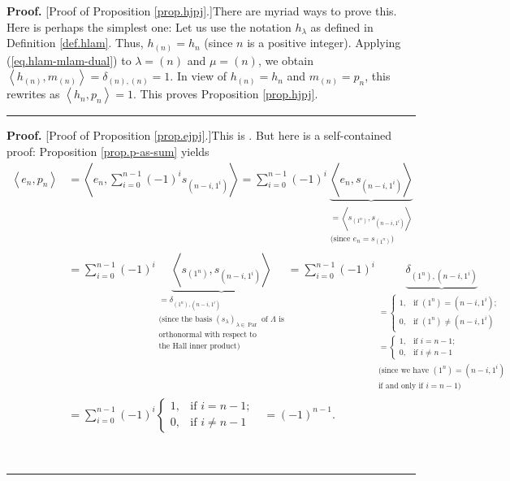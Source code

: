 \documentclass[numbers=enddot,12pt,final,onecolumn,notitlepage]{scrartcl}%
\theoremstyle{definition}
\newenvironment{proof}[1][Proof]{\noindent\textbf{#1.} }{\ \rule{0.5em}{0.5em}}
\let\sumnonlimits\sum
\renewcommand{\sum}{\sumnonlimits\limits}
\begin{document}
\begin{proof}
[Proof of Proposition \ref{prop.hjpj}.]There are myriad ways to prove this.
Here is perhaps the simplest one: Let us use the notation $h_{\lambda}$ as
defined in Definition \ref{def.hlam}. Thus, $h_{\left(  n\right)  }=h_{n}$
(since $n$ is a positive integer). Applying (\ref{eq.hlam-mlam-dual}) to
$\lambda=\left(  n\right)  $ and $\mu=\left(  n\right)  $, we obtain
$\left\langle h_{\left(  n\right)  },m_{\left(  n\right)  }\right\rangle
=\delta_{\left(  n\right)  ,\left(  n\right)  }=1$. In view of $h_{\left(
n\right)  }=h_{n}$ and $m_{\left(  n\right)  }=p_{n}$, this rewrites as
$\left\langle h_{n},p_{n}\right\rangle =1$. This proves Proposition
\ref{prop.hjpj}.
\end{proof}

\begin{proof}
[Proof of Proposition \ref{prop.ejpj}.]This is \cite[Exercise 2.8.8(a)]%
{GriRei}. But here is a self-contained proof: Proposition \ref{prop.p-as-sum}
yields%
\begin{align*}
\left\langle e_{n},p_{n}\right\rangle  &  =\left\langle e_{n},\sum_{i=0}%
^{n-1}\left(  -1\right)  ^{i}s_{\left(  n-i,1^{i}\right)  }\right\rangle
=\sum_{i=0}^{n-1}\left(  -1\right)  ^{i}\underbrace{\left\langle
e_{n},s_{\left(  n-i,1^{i}\right)  }\right\rangle }_{\substack{=\left\langle
s_{\left(  1^{n}\right)  },s_{\left(  n-i,1^{i}\right)  }\right\rangle
\\\text{(since }e_{n}=s_{\left(  1^{n}\right)  }\text{)}}}\\
&  =\sum_{i=0}^{n-1}\left(  -1\right)  ^{i}\underbrace{\left\langle s_{\left(
1^{n}\right)  },s_{\left(  n-i,1^{i}\right)  }\right\rangle }%
_{\substack{=\delta_{\left(  1^{n}\right)  ,\left(  n-i,1^{i}\right)
}\\\text{(since the basis }\left(  s_{\lambda}\right)  _{\lambda
\in\operatorname*{Par}}\text{ of }\Lambda\text{ is}\\\text{orthonormal with
respect to}\\\text{the Hall inner product)}}}=\sum_{i=0}^{n-1}\left(
-1\right)  ^{i}\underbrace{\delta_{\left(  1^{n}\right)  ,\left(
n-i,1^{i}\right)  }}_{\substack{=%
\begin{cases}
1, & \text{if }\left(  1^{n}\right)  =\left(  n-i,1^{i}\right)  ;\\
0, & \text{if }\left(  1^{n}\right)  \neq\left(  n-i,1^{i}\right)
\end{cases}
\\=%
\begin{cases}
1, & \text{if }i=n-1;\\
0, & \text{if }i\neq n-1
\end{cases}
\\\text{(since we have }\left(  1^{n}\right)  =\left(  n-i,1^{i}\right)
\\\text{if and only if }i=n-1\text{)}}}\\
&  =\sum_{i=0}^{n-1}\left(  -1\right)  ^{i}%
\begin{cases}
1, & \text{if }i=n-1;\\
0, & \text{if }i\neq n-1
\end{cases}
\ \ \ =\left(  -1\right)  ^{n-1}.
\end{align*}


\end{proof}
\end{document}
